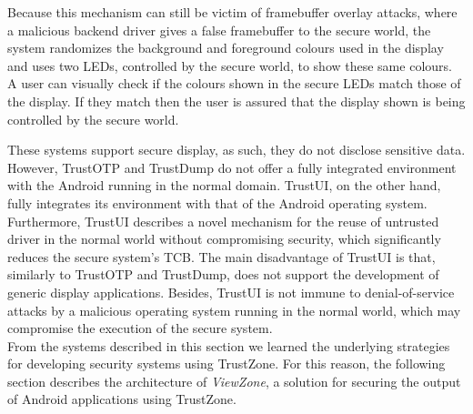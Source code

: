 Because this mechanism can still be victim of framebuffer overlay attacks, where a malicious backend driver gives a false framebuffer to the secure world, the system randomizes the background and foreground colours used in the display and uses two LEDs, controlled by the secure world, to show these same colours. A user can visually check if the colours shown in the secure LEDs match those of the display. If they match then the user is assured that the display shown is being controlled by the secure world.

These systems support secure display, as such, they do not disclose sensitive data. However, TrustOTP and TrustDump do not offer a fully integrated environment with the Android running in the normal domain. TrustUI, on the other hand, fully integrates its environment with that of the Android operating system. Furthermore, TrustUI describes a novel mechanism for the reuse of untrusted driver in the normal world without compromising security, which significantly reduces the secure system's TCB. The main disadvantage of TrustUI is that, similarly to TrustOTP and TrustDump, does not support the development of generic display applications. Besides, TrustUI is not immune to denial-of-service attacks by a malicious operating system running in the normal world, which may compromise the execution of the secure system.\\

From the systems described in this section we learned the underlying strategies for developing security systems using TrustZone. For this reason, the following section describes the architecture of \emph{ViewZone}, a solution for securing the output of Android applications using TrustZone.